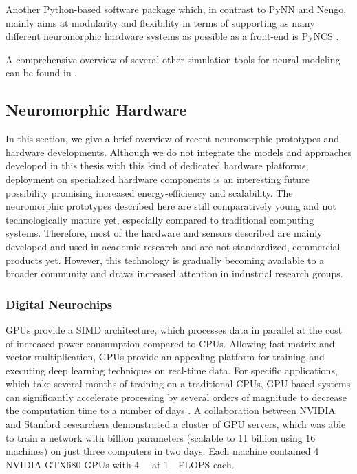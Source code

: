 Another Python-based software package which, in contrast to \ac{PyNN} and \ac{Nengo}, mainly aims at modularity and flexibility in terms of supporting as many different neuromorphic hardware systems as possible as a front-end is \ac{PyNCS} \cite{Stefanini2014}.

A comprehensive overview of several other simulation tools for neural modeling can be found in \cite{Brette2007}.

\subsection{Neuromorphic Hardware}
\label{sec:neuromorphic_HW}

In this section, we give a brief overview of recent neuromorphic prototypes and hardware developments.
Although we do not integrate the models and approaches developed in this thesis with this kind of dedicated hardware platforms, deployment on specialized hardware components is an interesting future possibility promising increased energy-efficiency and scalability.
The neuromorphic prototypes described here are still comparatively young and not technologically mature yet, especially compared to traditional computing systems.
Therefore, most of the hardware and sensors described are mainly developed and used in academic research and are not standardized, commercial products yet.
However, this technology is gradually becoming available to a broader community and draws increased attention in industrial research groups.

\subsubsection{Digital Neurochips}

\acp{GPU} provide a \ac{SIMD} architecture, which processes data in parallel at the cost of increased power consumption \cite{Krichmar2011, Carlson2014} compared to \acp{CPU}.
Allowing fast matrix and vector multiplication, \acp{GPU} provide an appealing platform for training and executing deep learning techniques \cite{Schmidhuber2015} on real-time data.
For specific applications, which take several months of training on a traditional \acp{CPU}, \ac{GPU}-based systems can significantly accelerate processing by several orders of magnitude to decrease the computation time to a number of days \cite{Edwards2015}.
A collaboration between NVIDIA and Stanford researchers demonstrated a cluster of \ac{GPU} servers, which was able to train a network with billion parameters (scalable to \num{11} billion using \num{16} machines) on just three computers in two days.
Each machine contained \num{4} NVIDIA GTX680 \acp{GPU} with \SI{4}{\giga\byte} at \SI{1}{\tera\nothing}\ac{FLOPS} each.

